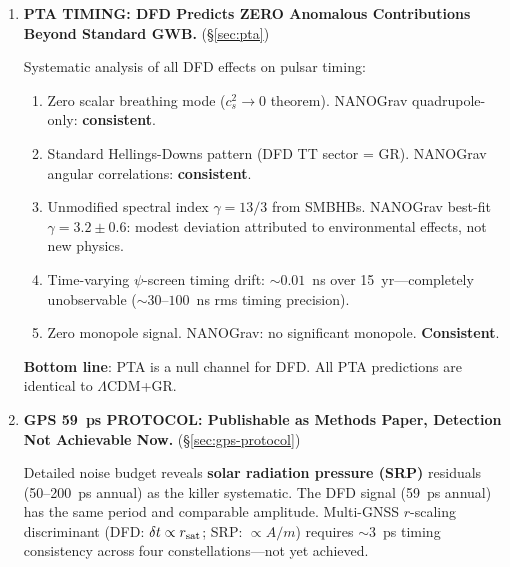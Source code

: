 \documentclass[11pt,a4paper]{article}
\begin{document}
\begin{tcolorbox}[colback=yellow!5!white, colframe=red!70!black,
  title=\textbf{W4i16 TOP 5 FINDINGS --- RANKED BY IMPACT}]
\begin{enumerate}
  Next-generation links with $10^{-21}$ instability (projected 2030+)
  would bring signals within $\sim 2\sigma$.  DFD predictions should
  be included in the science case for any CLONETS successor proposal
  (expected 2027--2028 Horizon Europe call) as a secondary target,
  with emphasis on north-south baselines (currently most links are
  east-west, suboptimal for the geoid $\psi$-gradient).

  \textbf{Assessment}: CLONETS is a \textbf{long-term channel}.
  Not actionable before $\sim$2032.

\item \textbf{PTA TIMING: DFD Predicts ZERO Anomalous Contributions
  Beyond Standard GWB.}
  (\S\ref{sec:pta})

  Systematic analysis of all DFD effects on pulsar timing:
  \begin{enumerate}[nosep]
  \item Zero scalar breathing mode ($c_s^2 \to 0$ theorem).
    NANOGrav quadrupole-only: \textbf{consistent}.
  \item Standard Hellings-Downs pattern (DFD TT sector = GR).
    NANOGrav angular correlations: \textbf{consistent}.
  \item Unmodified spectral index $\gamma = 13/3$ from SMBHBs.
    NANOGrav best-fit $\gamma = 3.2 \pm 0.6$: modest deviation
    attributed to environmental effects, not new physics.
  \item Time-varying $\psi$-screen timing drift: $\sim 0.01$~ns
    over 15~yr---completely unobservable ($\sim 30$--$100$~ns rms
    timing precision).
  \item Zero monopole signal. NANOGrav: no significant monopole.
    \textbf{Consistent}.
  \end{enumerate}

  \textbf{Bottom line}: PTA is a null channel for DFD.  All PTA
  predictions are identical to $\Lambda$CDM+GR.

\item \textbf{GPS 59~ps PROTOCOL: Publishable as Methods Paper,
  Detection Not Achievable Now.}
  (\S\ref{sec:gps-protocol})

  Detailed noise budget reveals \textbf{solar radiation pressure (SRP)}
  residuals (50--200~ps annual) as the killer systematic.  The DFD
  signal (59~ps annual) has the same period and comparable amplitude.
  Multi-GNSS $r$-scaling discriminant (DFD: $\delta t \propto r_{\rm sat}$;
  SRP: $\propto A/m$) requires $\sim 3$~ps timing consistency across
  four constellations---not yet achieved.


\end{enumerate}
\end{tcolorbox}
\end{document}
